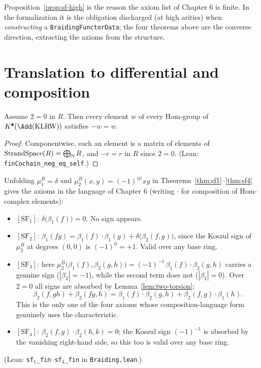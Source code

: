 \begin{remark}
  Proposition~\ref{prop:sf-high} is the reason the axiom list of Chapter 6 is
  finite. In the formalization it is the obligation discharged (at high
  arities) when \emph{constructing} a \texttt{BraidingFunctorData}; the
  four theorems above are the converse direction, extracting the axioms from
  the structure.
\end{remark}

\section{Translation to differential and composition}

\begin{lemma}[2-torsion]\label{lem:two-torsion}
  Assume $2 = 0$ in $R$. Then every element $w$ of every Hom-group of
  $K^\bullet(\Add(\KLRW))$ satisfies $-w = w$.
\end{lemma}

\begin{proof}
  Componentwise, such an element is a matrix of elements of
  $\text{StrandSpace}(R) = \bigoplus_{\mathbb{N}} R$, and $-r = r$ in $R$ since $2 = 0$.
  (Lean: \texttt{finCochain\_neg\_eq\_self}.)
\end{proof}

Unfolding $\mu^B_1 = \delta$ and $\mu^B_2(x,y) = (-1)^{|y|} xy$ in
Theorems~\ref{thm:sf1}--\ref{thm:sf4} gives the axioms in the language of
Chapter 6 (writing $\cdot$ for composition of Hom-complex elements):
\begin{itemize}
  \item $[\mathrm{SF}_1]$: $\delta\big(\beta_1(f)\big) = 0$. No sign appears.
  \item $[\mathrm{SF}_2]$: $\beta_1(fg) = \beta_1(f)\cdot\beta_1(g)
    + \delta\big(\beta_2(f,g)\big)$, since the Koszul sign of $\mu^B_2$ at
    degrees $(0,0)$ is $(-1)^0 = +1$. Valid over any base ring.
  \item $[\mathrm{SF}_3]$: here $\mu^B_2\big(\beta_1(f), \beta_2(g,h)\big)
    = (-1)^{-1}\, \beta_1(f)\cdot\beta_2(g,h)$ carries a genuine sign
    ($|\beta_2| = -1$), while the second term does not
    ($|\beta_1| = 0$). Over $2 = 0$ all signs are absorbed by
    Lemma~\ref{lem:two-torsion}:
    \[
      \beta_2(f, gh) + \beta_2(fg, h)
      = \beta_1(f)\cdot\beta_2(g,h) + \beta_2(f,g)\cdot\beta_1(h).
    \]
    This is the only one of the four axioms whose composition-language form
    genuinely uses the characteristic.
  \item $[\mathrm{SF}_4]$: $\beta_2(f,g)\cdot\beta_2(h,k) = 0$; the Koszul
    sign $(-1)^{-1}$ is absorbed by the vanishing right-hand side, so this
    too is valid over any base ring.
\end{itemize}
(Lean: \texttt{sf}$_1$\texttt{\_fin}--\texttt{sf}$_4$\texttt{\_fin} in
\texttt{Braiding.lean}.)

